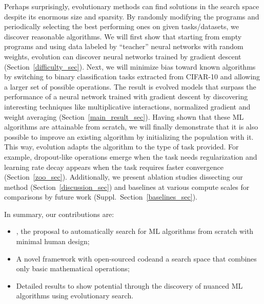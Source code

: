 Perhaps surprisingly, evolutionary methods can find solutions in the \amlz search space despite its enormous size and sparsity. By randomly modifying the programs and periodically selecting the best performing ones on given tasks/datasets, we discover reasonable algorithms. We will first show that starting from empty programs and using data labeled by ``teacher'' neural networks with random weights, evolution can discover neural networks trained by gradient descent (Section~\ref{difficulty_sec}). Next, we will minimize bias toward known algorithms by switching to binary classification tasks extracted from CIFAR-10 and allowing a larger set of possible operations. The result is evolved models that surpass the performance of a neural network trained with gradient descent by discovering interesting techniques like multiplicative interactions, normalized gradient and weight averaging (Section~\ref{main_result_sec}). Having shown that these ML algorithms are attainable from scratch, we will finally demonstrate that it is also possible to improve an existing algorithm by initializing the population with it. This way, evolution adapts the algorithm to the type of task provided. For example, dropout-like operations emerge when the task needs regularization and learning rate decay appears when the task requires faster convergence (Section~\ref{zoo_sec}). Additionally, we present ablation studies dissecting our method (Section~\ref{discussion_sec}) and baselines at various compute scales for comparisons by future work (Suppl.\ Section~\ref{baselines_sec}).

\renewcommand\labelitemi{\raisebox{1.5pt}{\fontsize{8}{8}$\bullet$}}

In summary, our contributions are:
\begin{itemize}[noitemsep,topsep=-5pt,leftmargin=*,labelsep=4pt]
    \item \amlz, the proposal to automatically search for ML algorithms from scratch with minimal human design;
    \item A novel framework with open-sourced code and a search space that combines only basic mathematical operations;
    \item Detailed results to show potential through the discovery of nuanced ML algorithms using evolutionary search.
\end{itemize}
